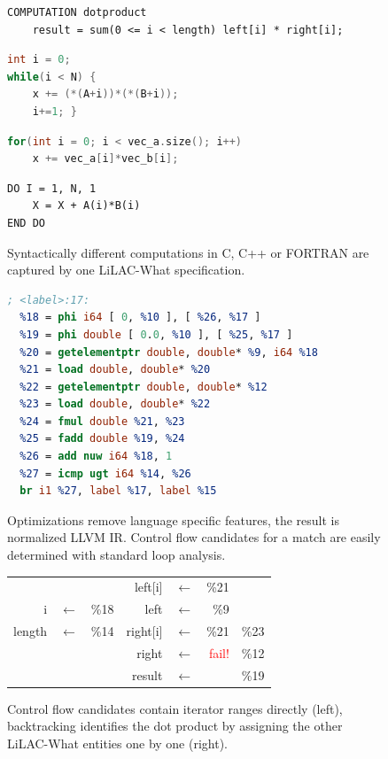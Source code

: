 \begin{figure}[p]
\begin{lstlisting}[language=LiLAC,numbers=none]
COMPUTATION dotproduct
    result = sum(0 <= i < length) left[i] * right[i];
\end{lstlisting}
\begin{lstlisting}[language=C,numbers=none]
int i = 0;
while(i < N) {
    x += (*(A+i))*(*(B+i));
    i+=1; }
\end{lstlisting}
\vspace{-0.75em}
\begin{lstlisting}[language=C++,numbers=none]
for(int i = 0; i < vec_a.size(); i++)
    x += vec_a[i]*vec_b[i];
\end{lstlisting}
\vspace{-0.75em}
\begin{lstlisting}[language=FORTRAN,numbers=none]
DO I = 1, N, 1
    X = X + A(i)*B(i)
END DO
\end{lstlisting}
\vspace{-0.75em}
\caption{Syntactically different computations in C, C++ or FORTRAN are captured
         by one LiLAC-What specification.}
\label{robustness}
\vspace{1em}
\begin{lstlisting}[language=llvm,numbers=none]
; <label>:17:
  %18 = phi i64 [ 0, %10 ], [ %26, %17 ]
  %19 = phi double [ 0.0, %10 ], [ %25, %17 ]
  %20 = getelementptr double, double* %9, i64 %18
  %21 = load double, double* %20
  %22 = getelementptr double, double* %12
  %23 = load double, double* %22
  %24 = fmul double %21, %23
  %25 = fadd double %19, %24
  %26 = add nuw i64 %18, 1
  %27 = icmp ugt i64 %14, %26
  br i1 %27, label %17, label %15
\end{lstlisting}
\vspace{-0.75em}
\caption{Optimizations remove language specific features, the result is
         normalized LLVM IR. Control flow candidates for a match are easily
         determined with standard loop analysis.}
\label{llvmexample}
\vspace{1em}
\begin{tabular}{rcr|rcrr}
       &              &      & left[i]  & $\leftarrow$&                 \%21   &     \\
     i & $\leftarrow$ & \%18 & left     & $\leftarrow$&                  \%9   &     \\
length & $\leftarrow$ & \%14 & right[i] & $\leftarrow$&                 \%21   & \%23\\
       &              &      & right    & $\leftarrow$& \textcolor{red}{fail!} & \%12\\
       &              &      & result   & $\leftarrow$&                        & \%19\\
\end{tabular}
\caption{Control flow candidates contain iterator ranges directly (left),
         backtracking identifies the dot product by assigning the other
         LiLAC-What entities one by one (right).}
\label{backtrack}
\end{figure}

